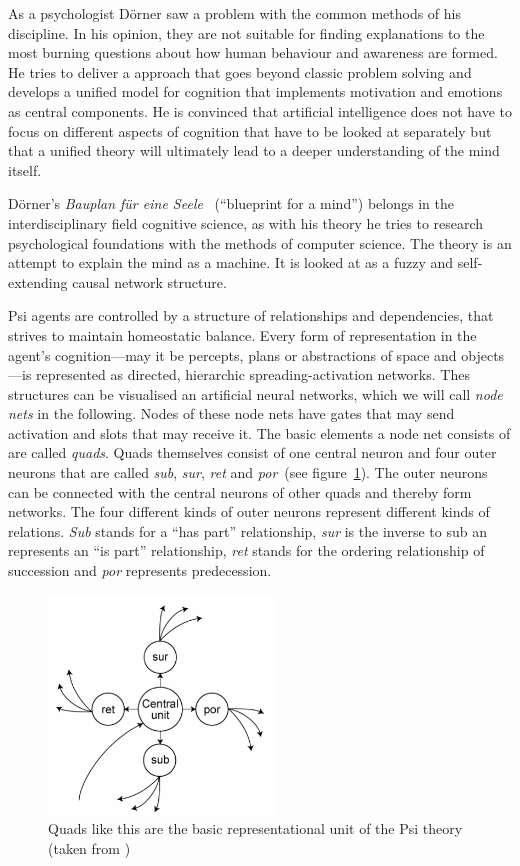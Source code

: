 As a psychologist Dörner saw a problem with the common methods of his discipline. In his opinion, they are not suitable for finding explanations to the most burning questions about how human behaviour and awareness are formed. He tries to deliver a      approach that goes beyond classic problem solving and develops a unified model for cognition that implements motivation and emotions as central components. He is convinced that artificial intelligence does not have to focus on different aspects of cognition that have to be looked at separately but that a unified theory will ultimately lead to a deeper understanding of the mind itself.
    
Dörner's \emph{Bauplan für eine Seele}~\cite{Doerner1998} (``blueprint for a mind'') belongs in the interdisciplinary field cognitive science, as with his theory he tries to research psychological foundations with the methods of computer science. The theory is an attempt to explain the mind as a machine. It is looked at as a fuzzy and self-extending causal network structure. 

Psi agents are controlled by a structure of relationships and dependencies, that strives to maintain homeostatic balance. Every form of representation in the agent's cognition---may it be percepts, plans or abstractions of space and objects---is represented as directed, hierarchic spreading-activation networks. Thes structures can be visualised an artificial neural networks, which we will call \emph{node nets} in the following. Nodes of these node nets have gates that may send activation and slots that may receive it. The basic elements a node net consists of are called \emph{quads}. Quads themselves consist of one central neuron and four outer neurons that are called \emph{sub}, \emph{sur}, \emph{ret} and \emph{por}~(see figure~\ref{quad}). The outer neurons can be connected with the central neurons of other quads and thereby form networks. The four different kinds of outer neurons represent different kinds of relations. \emph{Sub} stands for a ``has part'' relationship, \emph{sur} is the inverse to sub an represents an ``is part'' relationship, \emph{ret} stands for the ordering relationship of succession and \emph{por} represents predecession.

\begin{figure}[h]
  \centering
    \includegraphics[width=6cm]{graphics/quad}
  \caption[A quad]{Quads like this are the basic representational unit of the Psi theory (taken from \cite{Bach:2009:PSI:1611304})}
  \label{quad}
\end{figure}

